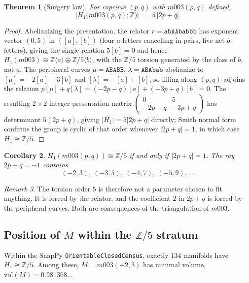 \documentclass[11pt,a4paper]{article}
\newtheorem{theorem}{Theorem}[section]
\newtheorem{corollary}[theorem]{Corollary}
\theoremstyle{definition}
\theoremstyle{remark}
\newtheorem{remark}[theorem]{Remark}
\newcommand{\Zfive}{\mathbb{Z}/5}
\newcommand{\Z}{\mathbb{Z}}
\begin{document}
\begin{theorem}[Surgery law]
\label{thm:surgery}
For coprime $(p,q)$ with $m003(p,q)$ defined,
\begin{equation}
\bigl| H_1\bigl(m003(p,q);\Z\bigr) \bigr| \;=\; 5\,|2p+q| .
\end{equation}
\end{theorem}

\begin{proof}
Abelianizing the presentation, the relator $r=\texttt{abAAbabbb}$ has
exponent vector $(0,5)$ in $([a],[b])$ (four $a$-letters cancelling in
pairs, five net $b$-letters), giving the single relation $5[b]=0$ and
hence $H_1(m003) \cong \Z\langle a\rangle \oplus \Zfive\langle
b\rangle$, with the $\Zfive$ torsion generated by the class of $b$, not
$a$. The peripheral curves $\mu=\texttt{ABABB}$, $\lambda=\texttt{ABAbab}$
abelianize to $[\mu]=-2[a]-3[b]$ and $[\lambda]=-[a]+[b]$, so filling
along $(p,q)$ adjoins the relation $p[\mu]+q[\lambda]=(-2p-q)[a]+
(-3p+q)[b]=0$. The resulting $2\times2$ integer presentation matrix
$\left(\begin{smallmatrix}0 & 5\\ -2p-q & -3p+q\end{smallmatrix}\right)$
has determinant $5(2p+q)$, giving $|H_1|=5|2p+q|$ directly; Smith
normal form confirms the group is cyclic of that order whenever
$|2p+q|=1$, in which case $H_1\cong\Zfive$.
\end{proof}

\begin{corollary}
\label{cor:z5ray}
$H_1(m003(p,q)) \cong \Zfive$ if and only if $|2p+q| = 1$. The ray
$2p+q = -1$ contains
\begin{equation}
(-2,3),\ (-3,5),\ (-4,7),\ (-5,9),\ \ldots
\end{equation}
\end{corollary}

\begin{remark}
The torsion order $5$ is therefore not a parameter chosen to fit
anything. It is forced by the relator, and the coefficient $2$ in
$2p+q$ is forced by the peripheral curves. Both are consequences of
the triangulation of $m003$.
\end{remark}

\subsection{Position of $M$ within the $\Zfive$ stratum}

Within the SnapPy \texttt{OrientableClosedCensus}, exactly $134$
manifolds have $H_1 \cong \Zfive$. Among these, $M = m003(-2,3)$
has minimal volume, $\mathrm{vol}(M) = 0.981368\ldots$
\end{document}
